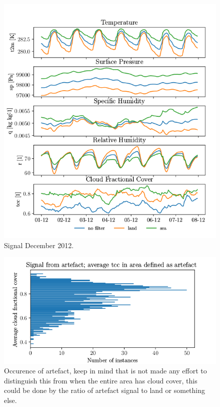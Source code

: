 \begin{figure}[ht]
    \centering
    \includegraphics{python_figs/spatially_averaged_one_week_from_2012-12-01.png}
    \caption{Signal December 2012.}
    \label{fig:dec12}
\end{figure}


\begin{figure}
    \centering
    \includegraphics{python_figs/signal_artefact.png}
    \caption{Occurence of artefact, keep in mind that is not made any effort to distinguish this from when the entire area has cloud cover, this could be done by the ratio of artefact signal to land or something else. }
    \label{fig:signal_artefact}
\end{figure}
